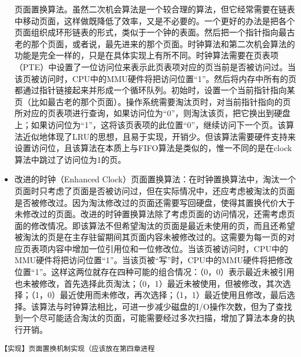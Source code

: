 \begin{itemize}
  页面置换算法。虽然二次机会算法是一个较合理的算法，但它经常需要在链表中移动页面，这样做既降低了效率，又是不必要的。一个更好的办法是把各个页面组织成环形链表的形式，类似于一个钟的表面。然后把一个指针指向最古老的那个页面，或者说，最先进来的那个页面。时钟算法和第二次机会算法的功能是完全一样的，只是在具体实现上有所不同。时钟算法需要在页表项（PTE）中设置了一位访问位来表示此页表项对应的页当前是否被访问过。当该页被访问时，CPU中的MMU硬件将把访问位置``1''。然后将内存中所有的页都通过指针链接起来并形成一个循环队列。初始时，设置一个当前指针指向某页（比如最古老的那个页面）。操作系统需要淘汰页时，对当前指针指向的页所对应的页表项进行查询，如果访问位为``0''，则淘汰该页，把它换出到硬盘上；如果访问位为``1''，这将该页表项的此位置``0''，继续访问下一个页。该算法近似地体现了LRU的思想，且易于实现，开销少。但该算法需要硬件支持来设置访问位，且该算法在本质上与FIFO算法是类似的，惟一不同的是在clock算法中跳过了访问位为1的页。
\item
  改进的时钟（Enhanced
  Clock）页面置换算法：在时钟置换算法中，淘汰一个页面时只考虑了页面是否被访问过，但在实际情况中，还应考虑被淘汰的页面是否被修改过。因为淘汰修改过的页面还需要写回硬盘，使得其置换代价大于未修改过的页面。改进的时钟置换算法除了考虑页面的访问情况，还需考虑页面的修改情况。即该算法不但希望淘汰的页面是最近未使用的页，而且还希望被淘汰的页是在主存驻留期间其页面内容未被修改过的。这需要为每一页的对应页表项内容中增加一位引用位和一位修改位。当该页被访问时，CPU中的MMU硬件将把访问位置``1''。当该页被``写''时，CPU中的MMU硬件将把修改位置``1''。这样这两位就存在四种可能的组合情况：（0，0）表示最近未被引用也未被修改，首先选择此页淘汰；（0，1）最近未被使用，但被修改，其次选择；（1，0）最近使用而未修改，再次选择；（1，1）最近使用且修改，最后选择。该算法与时钟算法相比，可进一步减少磁盘的I/O操作次数，但为了查找到一个尽可能适合淘汰的页面，可能需要经过多次扫描，增加了算法本身的执行开销。
\end{itemize}

\lstinline!【实现】页面置换机制实现（应该放在第四章进程!
